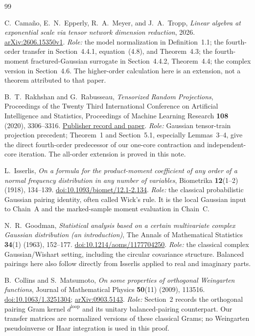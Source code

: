 \documentclass[11pt]{article}
\numberwithin{equation}{section}
\theoremstyle{definition}\newtheorem{definition}[theorem]{Definition}
\theoremstyle{remark}\newtheorem{remark}[theorem]{Remark}
\begin{document}
\clearpage
\begin{thebibliography}{99}
\raggedright
{}
\setlength{\itemsep}{8pt}

C.~Cama\~no, E.~N.~Epperly, R.~A.~Meyer, and J.~A.~Tropp,
\emph{Linear algebra at exponential scale via tensor network dimension reduction},
2026. \href{https://arxiv.org/abs/2606.15350v1}{arXiv:2606.15350v1}.
\textit{Role:} the model normalization in Definition~1.1; the fourth-order
transfer in Section~4.4.1, equation~(4.8), and Theorem~4.3; the fourth-moment
fractured-Gaussian surrogate in Section~4.4.2, Theorem~4.4; the complex version
in Section~4.6. The higher-order calculation here is an extension, not a theorem
attributed to that paper.

B.~T.~Rakhshan and G.~Rabusseau,
\emph{Tensorized Random Projections},
Proceedings of the Twenty Third International Conference on Artificial
Intelligence and Statistics, Proceedings of Machine Learning Research
\textbf{108} (2020), 3306--3316.
\href{https://proceedings.mlr.press/v108/rakhshan20a.html}{Publisher record and paper}.
\textit{Role:} Gaussian tensor-train projection precedent; Theorem~1 and
Section~5.1, especially Lemmas~3--4, give the direct fourth-order predecessor of
our one-core contraction and independent-core iteration. The all-order
extension is proved in this note.

L.~Isserlis,
\emph{On a formula for the product-moment coefficient of any order of a normal
frequency distribution in any number of variables},
Biometrika \textbf{12}(1--2) (1918), 134--139.
\href{https://doi.org/10.1093/biomet/12.1-2.134}{doi:10.1093/biomet/12.1-2.134}.
\textit{Role:} the classical probabilistic Gaussian pairing identity, often
called Wick's rule. It is the local Gaussian input to Chain~A and the marked-sample moment
evaluation in Chain~C.

N.~R.~Goodman,
\emph{Statistical analysis based on a certain multivariate complex Gaussian
distribution (an introduction)},
The Annals of Mathematical Statistics \textbf{34}(1) (1963), 152--177.
\href{https://doi.org/10.1214/aoms/1177704250}{doi:10.1214/aoms/1177704250}.
\textit{Role:} the classical complex Gaussian/Wishart setting, including the
circular covariance structure. Balanced pairings here also follow directly
from Isserlis applied to real and imaginary parts.

B.~Collins and S.~Matsumoto,
\emph{On some properties of orthogonal Weingarten functions},
Journal of Mathematical Physics \textbf{50}(11) (2009), 113516.
\href{https://doi.org/10.1063/1.3251304}{doi:10.1063/1.3251304};
\href{https://arxiv.org/abs/0903.5143}{arXiv:0903.5143}.
\textit{Role:} Section~2 records the orthogonal pairing Gram kernel
$d^{\mathrm{loop}}$ and its unitary balanced-pairing counterpart. Our transfer
matrices are normalized versions of these classical Grams; no Weingarten
pseudoinverse or Haar integration is used in this proof.


\end{thebibliography}
\end{document}
